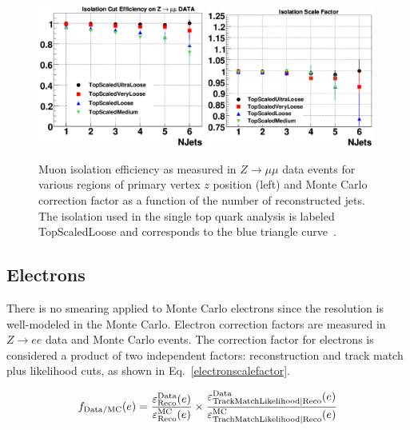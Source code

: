 \begin{figure}[!h!tbp]
\begin{center}
\includegraphics[width=0.49\textwidth]{eps/Reco/muoniso.eps}
\includegraphics[width=0.49\textwidth]{eps/Reco/muonisoscale.eps}
\end{center}
\vspace{-0.1in}
\caption{Muon isolation efficiency as measured in $Z\rightarrow \mu\mu$ data events for various regions of primary vertex $z$ position (left) and Monte Carlo correction factor as a function of the number of reconstructed jets. The isolation used in the single top quark analysis is labeled TopScaledLoose and corresponds to the blue triangle curve~\cite{muon}.}
\label{muonisoeffscale}
\end{figure}


\subsection{Electrons}

There is no smearing applied to Monte Carlo electrons since the resolution is well-modeled in the Monte Carlo. Electron correction factors are measured in $Z\rightarrow ee$ data and Monte Carlo events. The correction factor for electrons is considered a product of two independent factors: reconstruction and track match plus likelihood cuts, as shown in Eq.~\ref{electronscalefactor}.

\begin{equation}
\label{electronscalefactor}
f_{\rm{Data/MC}}(e) = \frac{\varepsilon^{\rm{Data}}_{\rm{Reco}}(e)}{\varepsilon^{\rm{MC}}_{\rm{Reco}}(e)} \times 
\frac{\varepsilon^{\rm{Data}}_{\rm{TrackMatchLikelihood|Reco}}(e)}{\varepsilon^{\rm{MC}}_{\rm{TrachMatchLikelihood|Reco}}(e)}
\end{equation}

